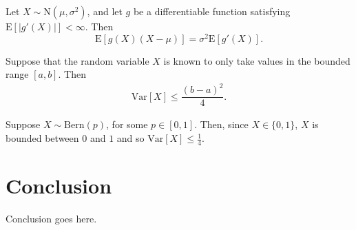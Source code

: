 \documentclass{statsmsc}
\begin{document}
\begin{lemma}
    Let $X \sim \mathrm{N}(\mu, \sigma^2)$, and let $g$ be a differentiable 
    function satisfying $\mathrm{E}[|g'(X)|] < \infty$. Then
    \begin{equation}
        \mathrm{E}[g(X)(X-\mu)] = \sigma^2 \mathrm{E}[g'(X)].
        \nonumber
    \end{equation}
\end{lemma}

\begin{proposition}
    Suppose that the random variable $X$ is known to only take values in the 
    bounded range $[a, b]$. Then  
    \begin{align}
        \mathrm{Var}[X] \leq \dfrac{(b-a)^2}{4}.
        \nonumber
    \end{align}
\end{proposition}

\begin{example}
    Suppose $X \sim \mathrm{Bern} (p)$, for some $p \in [0,1]$. Then, 
    since $X \in \{0, 1\}$, $X$ is bounded between $0$ and $1$ and so
    $\mathrm{Var}[X] \leq \tfrac{1}{4}$.
\end{example}



\chapter{Conclusion}


Conclusion goes here. 





\clearpage
\renewcommand*{\thepage}{A\arabic{page}}

%
%




\end{document}
